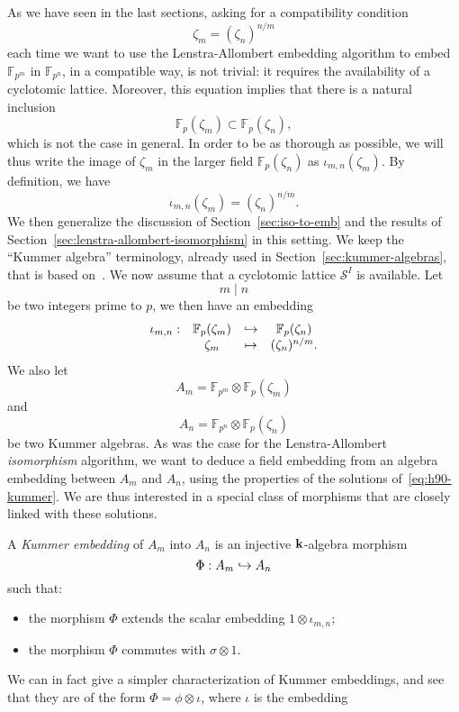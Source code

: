 As we have seen in the last sections, asking for a compatibility condition
\[
  \zeta_m = (\zeta_n)^{n/m}
\]
each time we want to use the Lenstra-Allombert embedding algorithm to embed
$\mathbb{F}_{p^m}$ in $\mathbb{F}_{p^n}$, in a compatible way, is not trivial:
it requires the availability of a cyclotomic lattice. Moreover, this equation
implies that there is a natural inclusion
\[
  \mathbb{F}_{p}(\zeta_m)\subset\mathbb{F}_{p}(\zeta_n),
\]
which is not the case in general. In order to be as thorough as possible, we
will thus write the image of $\zeta_m$ in the larger field
$\mathbb{F}_p(\zeta_n)$ as $\iota_{m, n}(\zeta_m)$. By definition, we have
\[
  \iota_{m, n}(\zeta_m) = (\zeta_{n})^{n/m}.
\]
We then generalize the discussion of Section~\ref{sec:iso-to-emb} and the
results of Section~\ref{sec:lenstra-allombert-isomorphism} in this setting. We
keep the ``Kummer algebra'' terminology, already used in
Section~\ref{sec:kummer-algebras}, that is based on~\cite{DRR19}. We now assume
that a cyclotomic lattice $\mathcal S^I$ is available. Let
\[
  m\mid n
\]
be two integers prime to $p$, we then have an embedding
\[
\begin{array}{cccc}
  \iota_{m, n}: & \mathbb{F}_{p}(\zeta_m)& \hookrightarrow &\mathbb{F}_{p}(\zeta_n)\\
  & \zeta_m & \mapsto & (\zeta_n)^{n/m}.
\end{array}
\]
We also let
\[
  A_m=\mathbb{F}_{p^m}\otimes\mathbb{F}_{p}(\zeta_m)
\]
and
\[
  A_n=\mathbb{F}_{p^n}\otimes\mathbb{F}_{p}(\zeta_n)
\]
be two Kummer algebras. As was the case for
the Lenstra-Allombert \emph{isomorphism} algorithm, we want to deduce a field
embedding from an algebra embedding between $A_m$ and $A_n$, using the
properties of the solutions of~\eqref{eq:h90-kummer}. We are thus
interested in a special class of morphisms that are closely linked with
these solutions.
\begin{defi}
  \label{defi:kummer-embedding}
  A \emph{Kummer embedding} of $A_m$ into $A_n$ is an injective
  $\mathbf{k}$-algebra morphism
  \[
    \Phi:A_m\hookrightarrow A_n
  \]
  such that:
  \begin{itemize}
    \item the morphism $\Phi$ extends the scalar embedding
      $1\otimes\iota_{m,n}$;
    \item the morphism $\Phi$ commutes with $\sigma\otimes1$.
  \end{itemize}
\end{defi}
We can in fact give a simpler characterization of Kummer embeddings, and see that
they are of the form $\Phi=\phi\otimes\iota$, where $\iota$ is the embedding
